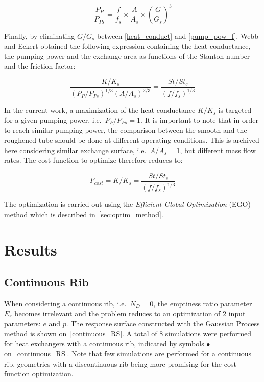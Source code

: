 \begin{equation}
\frac{P_{P}}{P_{Ps}} = \frac{f}{f_s} \times \frac{A}{A_s} \times \left( \frac{G}{G_s} \right)^3
\label{pump_pow_f}
\end{equation}

Finally, by eliminating $G/G_s$ between \cref{heat_conduct} and \cref{pump_pow_f}, Webb and Eckert obtained the following expression containing the heat conductance, the pumping power and the exchange area as functions of the Stanton number and the friction factor:

\begin{equation}
\frac{K/K_s}{(P_{P}/P_{Ps})^{1/3}(A/A_s)^{2/3}} = \frac{St/St_s}{(f/f_s)^{1/3}}
\label{webb_eckert}
\end{equation}

In the current work, a maximization of the heat conductance $K/K_s$ is targeted for a given pumping power, i.e.~$P_{P}/P_{Ps}=1$. It is important to note that in order to reach similar pumping power, the comparison between the smooth and the roughened tube should be done at different operating conditions. This is archived here considering similar exchange surface, i.e.~$A/A_s=1$, but different mass flow rates. The cost function to optimize therefore reduces to:

\begin{equation}
F_{cost} = K/K_s = \frac{St/St_s}{(f/f_s)^{1/3}}
\label{cost_function}
\end{equation}

The optimization is carried out using the \emph{Efficient Global Optimization} (EGO) method which is described in~\cref{sec:optim_method}.

\section{Results}
\label{sec:optim_results}

\subsection{Continuous Rib}
\label{sec:continuous_rib}

When considering a continuous rib, i.e.~$N_D=0$, the emptiness ratio parameter $E_r$ becomes irrelevant and the problem reduces to an optimization of 2 input parameters: $e$ and $p$. The response surface constructed with the Gaussian Process method is shown on~\cref{continuous_RS}. A total of 8 simulations were performed for heat exchangers with a continuous rib, indicated by symbols $\bullet$ on~\cref{continuous_RS}. Note that few simulations are performed for a continuous rib, geometries with a discontinuous rib being more promising for the cost function optimization.

